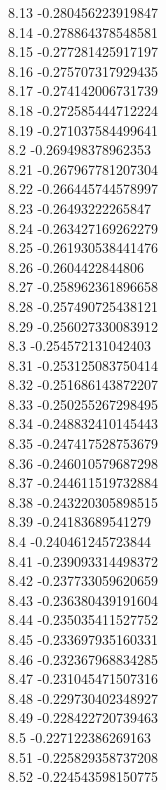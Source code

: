 {8.13	-0.280456223919847\\
8.14	-0.278864378548581\\
8.15	-0.277281425917197\\
8.16	-0.275707317929435\\
8.17	-0.274142006731739\\
8.18	-0.272585444712224\\
8.19	-0.271037584499641\\
8.2	-0.269498378962353\\
8.21	-0.267967781207304\\
8.22	-0.266445744578997\\
8.23	-0.26493222265847\\
8.24	-0.263427169262279\\
8.25	-0.261930538441476\\
8.26	-0.2604422844806\\
8.27	-0.258962361896658\\
8.28	-0.257490725438121\\
8.29	-0.256027330083912\\
8.3	-0.254572131042403\\
8.31	-0.253125083750414\\
8.32	-0.251686143872207\\
8.33	-0.250255267298495\\
8.34	-0.248832410145443\\
8.35	-0.247417528753679\\
8.36	-0.246010579687298\\
8.37	-0.244611519732884\\
8.38	-0.243220305898515\\
8.39	-0.24183689541279\\
8.4	-0.240461245723844\\
8.41	-0.239093314498372\\
8.42	-0.237733059620659\\
8.43	-0.236380439191604\\
8.44	-0.235035411527752\\
8.45	-0.233697935160331\\
8.46	-0.232367968834285\\
8.47	-0.231045471507316\\
8.48	-0.229730402348927\\
8.49	-0.228422720739463\\
8.5	-0.227122386269163\\
8.51	-0.225829358737208\\
8.52	-0.224543598150775\\
}
